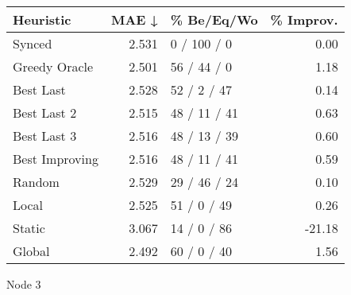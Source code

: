\begin{tabular}{lrlr}
\toprule
\textbf{Heuristic} & \textbf{MAE ↓} & \textbf{\% Be/Eq/Wo} & \textbf{\% Improv.} \\
\midrule
            Synced &          2.531 &          0 / 100 / 0 &                0.00 \\
     Greedy Oracle &          2.501 &          56 / 44 / 0 &                1.18 \\
         Best Last &          2.528 &          52 / 2 / 47 &                0.14 \\
       Best Last 2 &          2.515 &         48 / 11 / 41 &                0.63 \\
       Best Last 3 &          2.516 &         48 / 13 / 39 &                0.60 \\
    Best Improving &          2.516 &         48 / 11 / 41 &                0.59 \\
            Random &          2.529 &         29 / 46 / 24 &                0.10 \\
             Local &          2.525 &          51 / 0 / 49 &                0.26 \\
            Static &          3.067 &          14 / 0 / 86 &              -21.18 \\
            Global &          2.492 &          60 / 0 / 40 &                1.56 \\
\bottomrule
\end{tabular}
\caption{Node 3}
\label{tab:hr_iid_lr01_le1_bs4_3}
